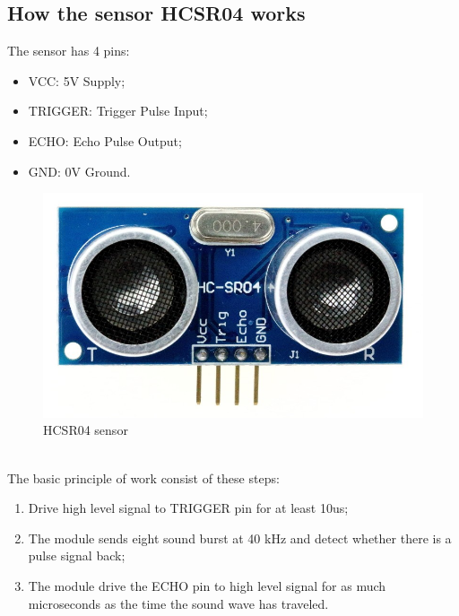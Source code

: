 \subsection{How the sensor HCSR04 works}
\begin{minipage}{0.5\textwidth}
The sensor has 4 pins:
\begin{itemize}
\item VCC: 5V Supply; 
\item TRIGGER: Trigger Pulse Input;
\item ECHO: Echo Pulse Output;
\item GND: 0V Ground.
\end{itemize} 
\end{minipage}
\begin{minipage}{0.4\textwidth}
\begin{figure}[H]
\includegraphics[width=\textwidth]{figures/raster/HCSR04}
\caption{\label{fig:sensor} HCSR04 sensor}
\end{figure}


\end{minipage} \hfill \\[1cm]



The basic principle of work consist of these steps:
\begin{enumerate}
\item Drive high level signal to TRIGGER pin for at least 10us;
\item The module sends eight sound burst  at 40 kHz and detect whether there is a
pulse signal back;
\item The module drive the ECHO pin to high level signal for as much microseconds as the time the sound wave has traveled. 
\end{enumerate} 

